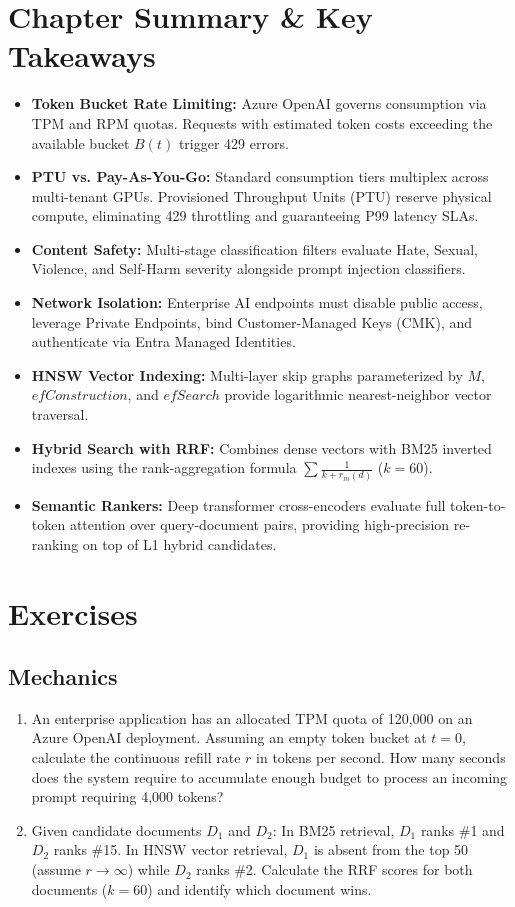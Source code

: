 \section{Chapter Summary \& Key Takeaways}
\begin{itemize}[leftmargin=15pt]
  \item \textbf{Token Bucket Rate Limiting:} Azure OpenAI governs consumption via TPM and RPM quotas. Requests with estimated token costs exceeding the available bucket $B(t)$ trigger 429 errors.
  \item \textbf{PTU vs. Pay-As-You-Go:} Standard consumption tiers multiplex across multi-tenant GPUs. Provisioned Throughput Units (PTU) reserve physical compute, eliminating 429 throttling and guaranteeing P99 latency SLAs.
  \item \textbf{Content Safety:} Multi-stage classification filters evaluate Hate, Sexual, Violence, and Self-Harm severity alongside prompt injection classifiers.
  \item \textbf{Network Isolation:} Enterprise AI endpoints must disable public access, leverage Private Endpoints, bind Customer-Managed Keys (CMK), and authenticate via Entra Managed Identities.
  \item \textbf{HNSW Vector Indexing:} Multi-layer skip graphs parameterized by $M$, $efConstruction$, and $efSearch$ provide logarithmic nearest-neighbor vector traversal.
  \item \textbf{Hybrid Search with RRF:} Combines dense vectors with BM25 inverted indexes using the rank-aggregation formula $\sum \frac{1}{k + r_m(d)}$ ($k=60$).
  \item \textbf{Semantic Rankers:} Deep transformer cross-encoders evaluate full token-to-token attention over query-document pairs, providing high-precision re-ranking on top of L1 hybrid candidates.
\end{itemize}

\section{Exercises}

\subsection{Mechanics}
\begin{enumerate}[leftmargin=18pt]
  \item An enterprise application has an allocated TPM quota of 120,000 on an Azure OpenAI deployment. Assuming an empty token bucket at $t=0$, calculate the continuous refill rate $r$ in tokens per second. How many seconds does the system require to accumulate enough budget to process an incoming prompt requiring 4,000 tokens?
  \item Given candidate documents $D_1$ and $D_2$: In BM25 retrieval, $D_1$ ranks \#1 and $D_2$ ranks \#15. In HNSW vector retrieval, $D_1$ is absent from the top 50 (assume $r \to \infty$) while $D_2$ ranks \#2. Calculate the RRF scores for both documents ($k=60$) and identify which document wins.
\end{enumerate}

